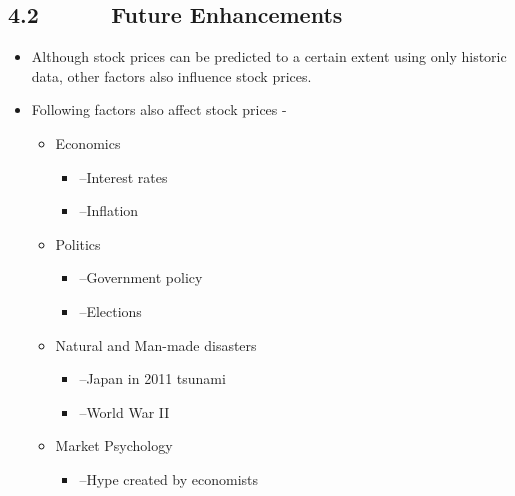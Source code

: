 \documentclass[12pt]{article}
\begin{document}
\subsection*{4.2\ \ \ \ \ \  Future Enhancements}
\setlength{\parskip}{0.0pt}
\begin{itemize}
	\item Although stock prices can be predicted to a certain extent using only historic data, other factors also influence stock prices.\par

	\item Following factors also affect stock prices -\par

\begin{itemize}
	\item Economics\par

\begin{itemize}
	\item –Interest rates\par

	\item –Inflation\par


\end{itemize}
	\item Politics\par

\begin{itemize}
	\item –Government policy\par

	\item –Elections\par


\end{itemize}
	\item Natural and Man-made disasters\par

\begin{itemize}
	\item –Japan in 2011 tsunami\par

	\item –World War II\par


\end{itemize}
	\item Market Psychology\par

\begin{itemize}
	\item –Hype created by economists
\end{itemize}
\end{itemize}
\end{itemize}\par
\end{document}
